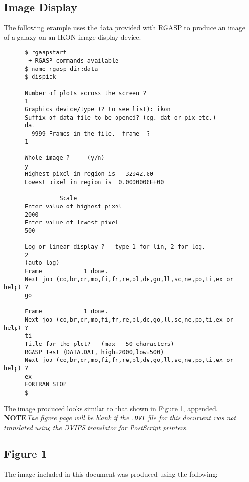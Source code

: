 \subsection{Image Display}

The following example uses the data provided with RGASP to produce an image of
a galaxy on an IKON image display device.

\begin{verbatim}
      $ rgaspstart
       + RGASP commands available
      $ name rgasp_dir:data
      $ dispick

      Number of plots across the screen ?
      1
      Graphics device/type (? to see list): ikon
      Suffix of data-file to be opened? (eg. dat or pix etc.)
      dat
        9999 Frames in the file.  frame  ?
      1

      Whole image ?     (y/n)
      y
      Highest pixel in region is   32042.00
      Lowest pixel in region is  0.0000000E+00

                Scale
      Enter value of highest pixel
      2000
      Enter value of lowest pixel
      500

      Log or linear display ? - type 1 for lin, 2 for log.
      2
      (auto-log)
      Frame            1 done.
      Next job (co,br,dr,mo,fi,fr,re,pl,de,go,ll,sc,ne,po,ti,ex or help) ?
      go

      Frame            1 done.
      Next job (co,br,dr,mo,fi,fr,re,pl,de,go,ll,sc,ne,po,ti,ex or help) ?
      ti
      Title for the plot?   (max - 50 characters)
      RGASP Test (DATA.DAT, high=2000,low=500)
      Next job (co,br,dr,mo,fi,fr,re,pl,de,go,ll,sc,ne,po,ti,ex or help) ?
      ex
      FORTRAN STOP
      $
\end{verbatim}
The image produced looks similar to that shown in Figure 1, appended.
{\bf NOTE}{\it The figure page will be blank if the {\tt .DVI} file for this
document was not translated using the DVIPS translator for PostScript
printers.}

\pagebreak
\subsection{Figure 1}

The image included in this document was produced using the following:

